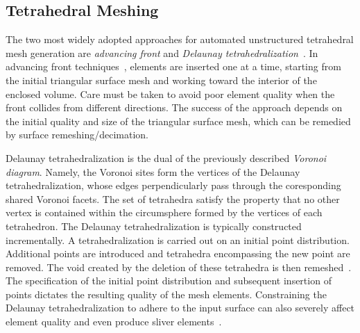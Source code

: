 \subsection{Tetrahedral Meshing}
\label{Tetrahedral Meshing}

The two most widely adopted approaches for automated unstructured tetrahedral mesh generation are \textit{advancing front} and \textit{Delaunay tetrahedralization}~\cite{lohner_1997}. In advancing front techniques~\cite{jin_1993, lohner_1988}, elements are inserted one at a time, starting from the initial triangular surface mesh and working toward the interior of the enclosed volume. Care must be taken to avoid poor element quality when the front collides from different directions. The success of the approach depends on the initial quality and size of the triangular surface mesh, which can be remedied by surface remeshing/decimation.

Delaunay tetrahedralization is the dual of the previously described \textit{Voronoi diagram}. Namely, the Voronoi sites form the vertices of the Delaunay tetrahedralization, whose edges perpendicularly pass through the coresponding shared Voronoi facets. The set of tetrahedra satisfy the property that no other vertex is contained within the circumsphere formed by the vertices of each tetrahedron. The Delaunay tetrahedralization is typically constructed incrementally. A tetrahedralization is carried out on an initial point distribution. Additional points are introduced and tetrahedra encompassing the new point are removed. The void created by the deletion of these tetrahedra is then remeshed~\cite{young_2008}. The specification of the initial point distribution and subsequent insertion of points dictates the resulting quality of the mesh elements. Constraining the Delaunay tetrahedralization to adhere to the input surface can also severely affect element quality and even produce sliver elements~\cite{lohner_1997}.

